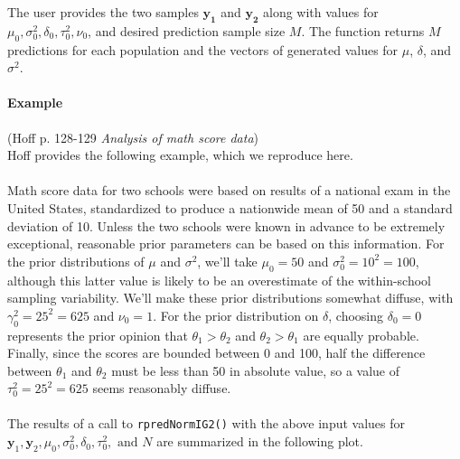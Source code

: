 \documentclass[12pt, a4paper]{article}
\begin{document}
\noindent The user provides the two samples $\mathbf{y_1}$ and $\mathbf{y_2}$ along with values for $\mu_0, \sigma^2_0, \delta_0, \tau^2_0, \nu_0$, and desired prediction sample size $M$.  The function returns $M$ predictions for each population and the vectors of generated values for $\mu$, $\delta$, and $\sigma^2$.

      \paragraph{Example} (Hoff p. 128-129 \textit{Analysis of math score data})\\
      Hoff provides the following example, which we reproduce here.\\\\
      Math score data for two schools were based on results of a national exam in the United States, standardized to produce a nationwide mean of 50 and a standard deviation of 10.  Unless the two schools were known in advance to be extremely exceptional, reasonable prior parameters can be based on this information.  For the prior distributions of $\mu$ and $\sigma^2$, we'll take $\mu_0 = 50$ and $\sigma^2_0 = 10^2 = 100$, although this latter value is likely to be an overestimate of the within-school sampling variability.  We'll make these prior distributions somewhat diffuse, with $\gamma^2_0 = 25^2 = 625$ and $\nu_0 = 1$.  For the prior distribution on $\delta$, choosing $\delta_0 = 0$ represents the prior opinion that $\theta_1 > \theta_2$ and $\theta_2 > \theta_1$ are equally probable.  Finally, since the scores are bounded between 0 and 100, half the difference between $\theta_1$ and $\theta_2$ must be less than 50 in absolute value, so a value of $\tau^2_0 = 25^2 = 625$ seems reasonably diffuse.\\\\
      The results of a call to \texttt{rpredNormIG2()} with the above input values for $\mathbf{y}_1,\mathbf{y}_2,\mu_0,\sigma^2_0,\delta_0,\tau^2_0,\text{ and } N$ are summarized in the following plot.\\
\end{document}
